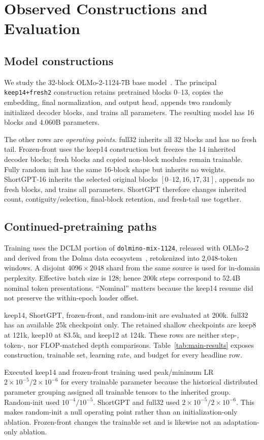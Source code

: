 \section{Observed Constructions and Evaluation}
\label{sec:method}

\subsection{Model constructions}
We study the 32-block OLMo-2-1124-7B base model~\citep{olmo2}. The principal
\texttt{keep14+fresh2} construction retains pretrained blocks 0--13, copies the
embedding, final normalization, and output head, appends two randomly
initialized decoder blocks, and trains all parameters. The resulting model has
16 blocks and 4.060B parameters.

The other rows are \emph{operating points}. full32 inherits all 32 blocks and
has no fresh tail. Frozen-front uses the keep14 construction but freezes the 14
inherited decoder blocks; fresh blocks and copied non-block modules remain
trainable. Fully random init has the same 16-block shape but inherits no
weights. ShortGPT-16 inherits the selected original blocks
$[0\text{--}12,16,17,31]$, appends no fresh blocks, and trains all parameters.
ShortGPT therefore changes inherited count, contiguity/selection, final-block
retention, and fresh-tail use together.

\subsection{Continued-pretraining paths}
Training uses the DCLM portion of \texttt{dolmino-mix-1124}, released with
OLMo-2 and derived from the Dolma data ecosystem~\citep{olmo2,dolma}, retokenized into
2,048-token windows. A disjoint $4096\times2048$ shard from the same source is
used for in-domain perplexity. Effective batch size is 128; hence 200k steps
correspond to 52.4B nominal token presentations. ``Nominal''
matters because the keep14 resume did not preserve the within-epoch loader
offset.

keep14, ShortGPT, frozen-front, and random-init are evaluated at 200k. full32 has an available 25k checkpoint only. The retained shallow checkpoints are keep8 at 121k, keep10 at 83.5k, and keep12 at 124k. These rows are neither step-, token-, nor FLOP-matched depth comparisons. Table~\ref{tab:main-results} exposes construction, trainable set,
learning rate, and budget for every headline row.

Executed keep14 and frozen-front training used peak/minimum LR
$2\times10^{-5}/2\times10^{-6}$ for every trainable parameter because the
historical distributed parameter grouping assigned all trainable tensors to
the inherited group. Random-init used $10^{-4}/10^{-5}$. ShortGPT and full32
used $2\times10^{-5}/2\times10^{-6}$. This makes random-init a null operating
point rather than an initialization-only ablation. Frozen-front changes the
trainable set and is likewise not an adaptation-only ablation.

